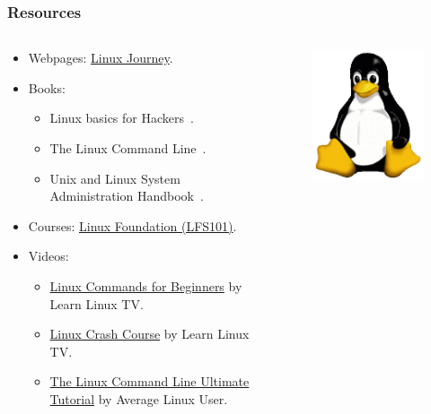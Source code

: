 \documentclass[aspectratio=169]{beamer}
\begin{document}
\begin{frame}
    \frametitle{Resources}
    \begin{columns}
        \begin{column}{0.5\textwidth}
            \begin{itemize}
                \item Webpages: \href{https://linuxjourney.com/}{Linux Journey}.
                \item Books: 
                    \begin{itemize}
                        \item Linux basics for Hackers~\cite{occupytheweb2018}.
                        \item The Linux Command Line~\cite{shotts2019}.
                        \item Unix and Linux System Administration 
                            Handbook~\cite{mackin2017}.
                    \end{itemize}
                \item Courses: 
                    \href{https://training.linuxfoundation.org/training/introduction-to-linux/}
                    {Linux Foundation (LFS101)}.
                \item Videos: 
                    \begin{itemize}
                        \item \href{https://www.learnlinux.tv/linux-commands-for-beginners/}
                            {Linux Commands for Beginners} by Learn Linux TV.
                        \item \href{https://www.learnlinux.tv/linux-essentials/}
                            {Linux Crash Course} by Learn Linux TV.
                        \item \href{https://www.youtube.com/watch?v=px8D72loRVg&list=PLSmXPSsgkZLuJKJhvL1U384aHesbVDekO}
                            {The Linux Command Line Ultimate Tutorial} by 
                            Average Linux User.
                    \end{itemize}
            \end{itemize}
        \end{column}
        \begin{column}{0.5\textwidth}
            \begin{figure}
                \centering
                \includegraphics[scale=0.6]{logos/tux.png}

\end{figure}
\end{column}
\end{columns}
\end{frame}
\end{document}
